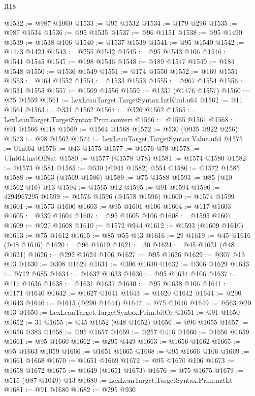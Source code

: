 \begin{lexlean}{R18}
\begin{coremodule}
@1532 := @987 @1060
@1533 := @95 @1532
@1534 := @179 @296
@1535 := @987 @1534
@1536 := @95 @1535
@1537 := @96 @1151
@1538 := @95 @1490
@1539 := @1538 @106
@1540 := @1537 @1539
@1541 := @95 @1540
@1542 := @1473 @1424
@1543 := @255 @1542
@1545 := @95 @1543 @106
@1546 := @1541 @1545
@1547 := @198 @1546
@1548 := @189 @1547
@1549 := @184 @1548
@1550 := @1536 @1549
@1551 := @174 @1550
@1552 := @169 @1551
@1553 := @164 @1552
@1554 := @1533 @1553
@1555 := @967 @1554
@1556 := @1531 @1555
@1557 := @1509 @1556
@1559 := @1337 (@1476 @1557)
@1560 := @75 @1559
@1561 := LexLeanTarget.TargetSyntax.IntKind.u64
@1562 := @11 @1561
@1563 := @331 @1562
@1564 := @526 @1562
@1565 := LexLeanTarget.TargetSyntax.Prim.convert
@1566 := @1565 @1561
@1568 := @91 @1566 @118
@1569 := @1564 @1568
@1572 := @530 (@935 @922 @256)
@1573 := @98 @1562
@1574 := LexLeanTarget.TargetSyntax.Value.u64
@1575 := UInt64
@1576 := @43 @1575
@1577 := @1576 @78
@1578 := UInt64.instOfNat
@1580 := @1577 (@1578 @78)
@1581 := @1574 @1580
@1582 := @1573 @1581
@1585 := @530 (@941 @1582) @554
@1586 := @1572 @1585
@1588 := @1563 (@1569 @1586)
@1589 := @75 @1588
@1593 := @85 (@10 @1562 @16) @13
@1594 := @1565 @12
@1595 := @91 @1594
@1596 := 4294967295
@1599 := @1576 @1596 (@1578 @1596)
@1600 := @1574 @1599
@1601 := @1573 @1600
@1603 := @95 @1601 @106
@1604 := @117 @1603
@1605 := @339 @1604
@1607 := @95 @1605 @106
@1608 := @1595 @1607
@1609 := @927 @1608
@1610 := @1572 @944
@1612 := @1593 (@1609 @1610)
@1613 := @75 @1612
@1615 := @85 @55 @13
@1616 := 29
@1619 := @45 @1616 (@48 @1616)
@1620 := @96 @1619
@1621 := 30
@1624 := @45 @1621 (@48 @1621)
@1626 := @292 @1624 @106
@1627 := @95 @1626
@1629 := @307 @13 @13
@1630 := @308 @1629
@1631 := @306 @1630
@1632 := @306 @1629
@1633 := @712 @685
@1634 := @1632 @1633
@1636 := @95 @1634 @106
@1637 := @117 @1636
@1638 := @1631 @1637
@1640 := @95 @1638 @106
@1641 := @1171 @1640
@1642 := @1627 @1641
@1643 := @1620 @1642
@1644 := @290 @1643
@1646 := @1615 (@290 @1644)
@1647 := @75 @1646
@1649 := @563 @20 @13
@1650 := LexLeanTarget.TargetSyntax.Prim.bitOr
@1651 := @91 @1650
@1652 := 31
@1655 := @45 @1652 (@48 @1652)
@1656 := @96 @1655
@1657 := @1656 @383
@1658 := @95 @1657
@1659 := @257 @416
@1660 := @1656 @1659
@1661 := @95 @1660
@1662 := @295 @449
@1663 := @1656 @1662
@1665 := @95 @1663 @1059
@1666 := @1651 @1665
@1668 := @95 @1666 @106
@1669 := @1661 @1668
@1670 := @1651 @1669
@1672 := @95 @1670 @106
@1673 := @1658 @1672
@1675 := @1649 (@1651 @1673)
@1676 := @75 @1675
@1679 := @515 (@87 @1049) @13
@1680 := LexLeanTarget.TargetSyntax.Prim.natLt
@1681 := @91 @1680
@1682 := @295 @930

\end{coremodule}
\end{lexlean}
